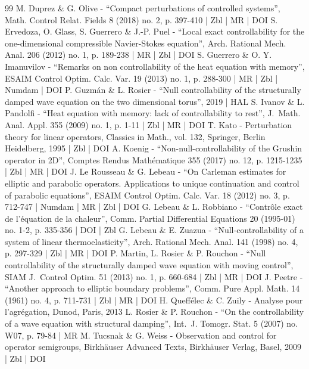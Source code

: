 \begin{thebibliography}{99}
M. Duprez \& G. Olive - “Compact perturbations of controlled systems”, Math. Control Relat. Fields 8 (2018) no. 2, p. 397-410 | Zbl | MR | DOI
S. Ervedoza, O. Glass, S. Guerrero \& J.-P. Puel - “Local exact controllability for the one-dimensional compressible Navier-Stokes equation”, Arch. Rational Mech. Anal. 206 (2012) no. 1, p. 189-238 | MR | Zbl | DOI
S. Guerrero \& O. Y. Imanuvilov - “Remarks on non controllability of the heat equation with memory”, ESAIM Control Optim. Calc. Var. 19 (2013) no. 1, p. 288-300 | MR | Zbl | Numdam | DOI
P. Guzmán \& L. Rosier - “Null controllability of the structurally damped wave equation on the two dimensional torus”, 2019 | HAL
S. Ivanov \& L. Pandolfi - “Heat equation with memory: lack of controllability to rest”, J. Math. Anal. Appl. 355 (2009) no. 1, p. 1-11 | Zbl | MR | DOI
T. Kato - Perturbation theory for linear operators, Classics in Math., vol. 132, Springer, Berlin Heidelberg, 1995 | Zbl | DOI
A. Koenig - “Non-null-controllability of the Grushin operator in 2D”, Comptes Rendus Mathématique 355 (2017) no. 12, p. 1215-1235 | Zbl | MR | DOI
J. Le Rousseau \& G. Lebeau - “On Carleman estimates for elliptic and parabolic operators. Applications to unique continuation and control of parabolic equations”, ESAIM Control Optim. Calc. Var. 18 (2012) no. 3, p. 712-747 | Numdam | MR | Zbl | DOI
G. Lebeau \& L. Robbiano - “Contrôle exact de l’équation de la chaleur”, Comm. Partial Differential Equations 20 (1995-01) no. 1-2, p. 335-356 | DOI | Zbl
G. Lebeau \& E. Zuazua - “Null-controllability of a system of linear thermoelasticity”, Arch. Rational Mech. Anal. 141 (1998) no. 4, p. 297-329 | Zbl | MR | DOI
P. Martin, L. Rosier \& P. Rouchon - “Null controllability of the structurally damped wave equation with moving control”, SIAM J. Control Optim. 51 (2013) no. 1, p. 660-684 | Zbl | MR | DOI
J. Peetre - “Another approach to elliptic boundary problems”, Comm. Pure Appl. Math. 14 (1961) no. 4, p. 711-731 | Zbl | MR | DOI
H. Queffélec \& C. Zuily - Analyse pour l’agrégation, Dunod, Paris, 2013
L. Rosier \& P. Rouchon - “On the controllability of a wave equation with structural damping”, Int. J. Tomogr. Stat. 5 (2007) no. W07, p. 79-84 | MR
M. Tucsnak \& G. Weiss - Observation and control for operator semigroups, Birkhäuser Advanced Texts, Birkhäuser Verlag, Basel, 2009 | Zbl | DOI
\end{thebibliography}
